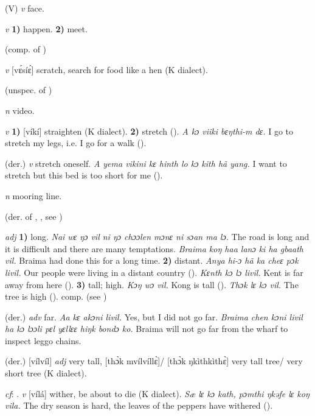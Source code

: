 \begin{letter}{(V)}
 \textit{v} face.

 \textit{v} \textbf{1)} happen. \textbf{2)} meet.

 (comp. of ) 

 \textit{v} [vɛ́síɛ́] scratch, search for food like a hen (K dialect). 

 (unspec. of ) 

 \textit{n} video.

 \textit{v} \textbf{1)} [víkí] straighten (K dialect). \textbf{2)} stretch (\citealt{Sumner1921}). \textit{A kɔ viiki bɛŋthi-m dɛ.} I go to stretch my legs, i.e. I go for a walk (\citealt{Pichl1967}).

 (der.) \textit{v} stretch oneself. \textit{A yema vikini kɛ hinth lo kɔ kith hã yang.} I want to stretch but this bed is too short for me (\citealt{Pichl1967}). 

 \textit{n} mooring line.

 (der. of , , see ) 

 \textit{adj} \textbf{1)} long. \textit{Nai wɛ ŋɔ vil ni ŋɔ chɔɔlen mɔnɛ ni sɔan ma lɔ.} The road is long and it is difficult and there are many temptations. \textit{Braima koŋ haa lanɔ ki ha gbaath vil.} Braima had done this for a long time. \textbf{2)} distant. \textit{Anya hi-ɔ hã ka cheɛ pɔk livil.} Our people were living in a distant country (\citealt{Pichl1967}). \textit{Kɛnth kɔ lɔ livil.} Kent is far away from here (\citealt{Pichl1967}). \textbf{3)} tall; high. \textit{Kɔŋ wɔ vil.} Kong is tall (\citealt{Pichl1967}). \textit{Thɔk lɛ kɔ vil.} The tree is high (\citealt{Pichl1967}). comp.  (see ) 

 (der.) \textit{adv} far. \textit{Aa kɛ akɔni livil.} Yes, but I did not go far. \textit{Braima chen kɔni livil ha kɔ lɔɔli pɛl yɛllɛɛ hiŋk bondɔ ko.} Braima will not go far from the wharf to inspect leggo chains.

 (der.) [vílvíl] \textit{adj} very tall, [thɔ̀k mvílvíllɛ̀]/ [thɔ̀k ŋkìthkìthɛ̀] very tall tree/ very short tree (K dialect). 

 \textit{cf}: . \textit{v} [vílá] wither, be about to die (K dialect). \textit{Sæ lɛ kɔ kath, pɔmthi ŋkəfe lɛ koŋ vila.} The dry season is hard, the leaves of the peppers have withered (\citealt{Pichl1967}). 


\end{letter}
